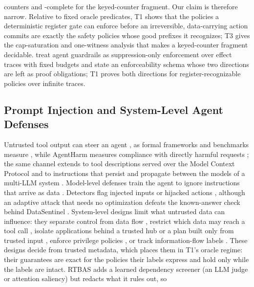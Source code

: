 counters and \PSPACE-complete for the keyed-counter fragment.
Our claim is therefore narrow. Relative to fixed oracle predicates, T1 shows that the policies a
deterministic register gate can enforce before an irreversible, data-carrying action commits are
exactly the safety policies whose good prefixes it recognizes; T3 gives the cap-saturation and
one-witness analysis that makes a keyed-counter fragment decidable. \citet{david2026alignment} treat
agent guardrails as suppression-only enforcement over effect traces with fixed
budgets and state an enforceability schema whose two directions are left as
proof obligations; T1 proves both directions for register-recognizable
policies over infinite traces.

\subsection{Prompt Injection and System-Level Agent Defenses}
Untrusted tool output can steer an agent \citep{greshake2023injection}, as formal frameworks
and benchmarks measure
\citep{liu2024formalizing,debenedetti2024agentdojo,zhan2024injecagentbench},
while AgentHarm measures compliance with directly harmful requests
\citep{andriushchenko2025agentharm};
the same channel extends to tool descriptions served over the Model Context Protocol
\citep{guo2026mcpxkit} and to instructions that persist and propagate between the models of a
multi-LLM system \citep{yang2026cracks}.
Model-level defenses train the agent to ignore instructions that arrive as
data \citep{chen2025struq,chen2025secalign}. Detectors flag injected inputs or
hijacked actions \citep{liu2025datasentinel,zhu2025melon,jia2025taskshield}, although an adaptive
attack that needs no optimization defeats the known-answer check behind
\mbox{DataSentinel} \citep{choudhary2025hownot}. System-level designs limit what untrusted data
can influence: they separate control from data flow \citep{debenedetti2025camel}, restrict which
data may reach a tool call \citep{beurerkellner2025design}, isolate applications behind a trusted
hub or a plan built only from trusted input \citep{wu2025isolategpt,li2026ace}, enforce privilege
policies \citep{progent2025}, or track information-flow labels
\citep{costa2025fides,zhong2025rtbas}. These designs decide
from trusted metadata, which places them in T1's oracle regime: their guarantees are exact for
the policies their labels express and hold only while the labels are intact. RTBAS adds a learned
dependency screener (an LLM judge or attention saliency) but redacts what it rules out, so
